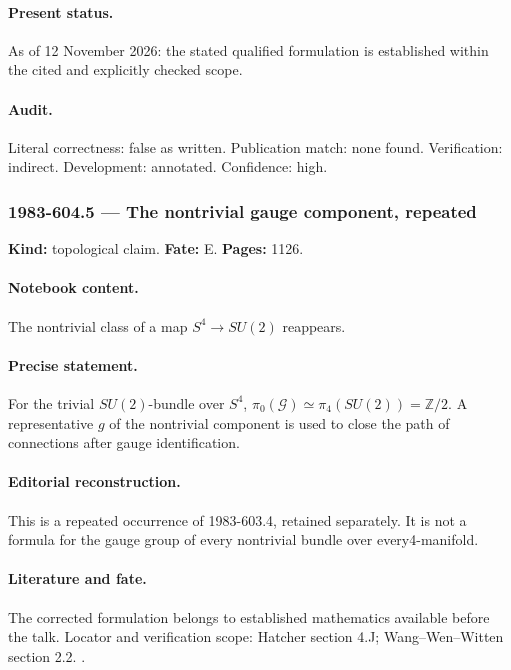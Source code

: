 \paragraph{Present status.} As of 12 November 2026: the stated qualified formulation is established within the cited and explicitly checked scope.

\paragraph{Audit.} Literal correctness: false as written. Publication match: none found. Verification: indirect. Development: annotated. Confidence: high.

\subsubsection{1983-604.5 --- The nontrivial gauge component, repeated}

\label{item:1983-604.5}

\noindent\textbf{Kind:} topological claim. \textbf{Fate:} E. \textbf{Pages:} 1126.\par

\paragraph{Notebook content.} The nontrivial class of a map \(S^4\to SU(2)\) reappears.

\paragraph{Precise statement.} For the trivial \(SU(2)\)-bundle over \(S^4\), \(\pi_0(\mathcal G)\simeq\pi_4(SU(2))=\mathbb Z/2\). A representative \(g\) of the nontrivial component is used to close the path of connections after gauge identification.

\paragraph{Editorial reconstruction.} This is a repeated occurrence of 1983-603.4, retained separately. It is not a formula for the gauge group of every nontrivial bundle over every4-manifold.

\paragraph{Literature and fate.} The corrected formulation belongs to established mathematics available before the talk. Locator and verification scope: Hatcher section 4.J; Wang--Wen--Witten section 2.2. \cite{hatcher2002algebraic,wangwenwitten2019new}.

